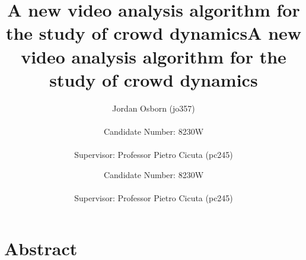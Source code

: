 \documentclass[10pt]{article}
\title{A new video analysis algorithm for the study of crowd dynamics}
\author{Jordan Osborn (jo357)
\\\\
Candidate Number: 8230W
\\\\
Supervisor: Professor Pietro Cicuta (pc245)}
\begin{document}
\begin{titlingpage}
    \maketitle
\end{titlingpage}


\clearpage
\title{A new video analysis algorithm for the study of crowd dynamics}
\author{Candidate Number: 8230W
\\\\
Supervisor: Professor Pietro Cicuta (pc245)}
\maketitle
\section*{Abstract}
\end{document}
